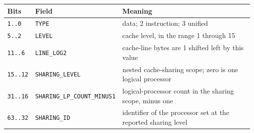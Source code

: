 \Needspace{1.25in}
\begingroup\footnotesize
\setlength{\aboverulesep}{0pt}
\setlength{\belowrulesep}{0pt}
\setlength{\extrarowheight}{1.2pt}
\begin{center}
\begin{tabularx}{\linewidth}{@{}>{\raggedright\arraybackslash}p{0.65in}>{\raggedright\arraybackslash}p{2.10in}>{\raggedright\arraybackslash}X@{}}
\toprule
\rowcolor{ManualHeaderFill}
\textbf{Bits} & \textbf{Field} & \textbf{Meaning}\\
\midrule
\texttt{1..0} & \texttt{TYPE} & 1 data; 2 instruction; 3 unified\\
\texttt{5..2} & \texttt{LEVEL} & cache level, in the range 1 through 15\\
\texttt{11..6} & \texttt{LINE\_LOG2} & cache-line bytes are 1 shifted left by this value\\
\texttt{15..12} & \texttt{SHARING\_LEVEL} & nested cache-sharing scope; zero is one logical processor\\
\texttt{31..16} & \texttt{SHARING\_LP\_COUNT\_MINUS1} & logical-processor count in the sharing scope, minus one\\
\texttt{63..32} & \texttt{SHARING\_ID} & identifier of the processor set at the reported sharing level\\
\bottomrule
\end{tabularx}
\end{center}
\endgroup
